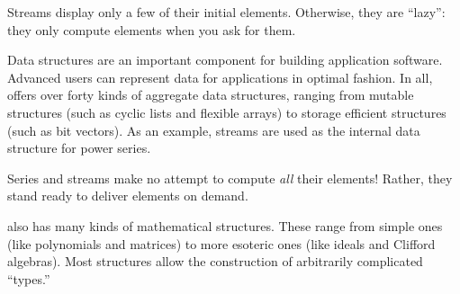 Streams display only a few of their initial elements.
Otherwise, they are ``lazy'': they
only compute elements when you ask for them.

Data structures are an important component for building
application software. Advanced users can
represent data for applications in optimal fashion.
In all, \Language{} offers
over forty kinds of aggregate data structures, ranging
from mutable structures (such as cyclic lists and flexible arrays) to
storage efficient structures (such as bit vectors).
As an example, streams are used as the internal data structure
for power series.

%

Series and streams make no attempt to compute {\it all} their elements!
Rather, they stand ready to deliver elements on demand.

%


\Language{} also has many kinds of mathematical structures.
These range from simple ones (like polynomials and matrices) to
more esoteric ones (like ideals and Clifford algebras).
Most structures allow the construction of arbitrarily complicated
``types.''

%

